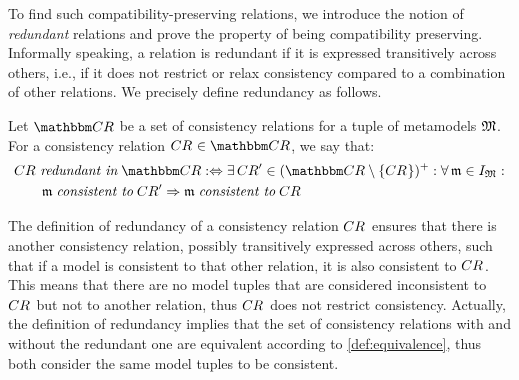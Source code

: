 To find such compatibility-preserving relations, we introduce the notion of \emph{redundant} relations and prove the property of being compatibility preserving.
Informally speaking, a relation is redundant if it is expressed transitively across others, i.e., if it does not restrict or relax consistency compared to a combination of other relations.
We precisely define redundancy as follows.

\begin{definition}
\label{def:redundancy}
    Let $\consistencyrelationset{CR}$ be a set of consistency relations for a tuple of metamodels $\metamodeltuple{M}$.
    For a consistency relation $\consistencyrelation{CR}{} \in \consistencyrelationset{CR}$, we say that:
    \begin{align*}
        &
        \consistencyrelation{CR}{} \redundantinmath \consistencyrelationset{CR} \equivalentperdefinition
        \exists \consistencyrelation{CR}{}' \in \transitiveclosure{(\consistencyrelationset{CR} \setminus \setted{\consistencyrelation{CR}{}})} : 
        \forall \modeltuple{m} \in \metamodeltupleinstanceset{M} :\\
        & \formulaskip\formulaskip
        \modeltuple{m} \consistenttomath \consistencyrelation{CR}{}' \Rightarrow \modeltuple{m} \consistenttomath \consistencyrelation{CR}{}
    \end{align*}
\end{definition}

The definition of redundancy of a consistency relation $\consistencyrelation{CR}{}$ ensures that there is another consistency relation, possibly transitively expressed across others, such that if a model is consistent to that other relation, it is also consistent to $\consistencyrelation{CR}{}$.
This means that there are no model tuples that are considered inconsistent to $\consistencyrelation{CR}{}$ but not to another relation, thus $\consistencyrelation{CR}{}$ does not restrict consistency.
Actually, the definition of redundancy implies that the set of consistency relations with and without the redundant one are equivalent according to \autoref{def:equivalence}, thus both consider the same model tuples to be consistent.

